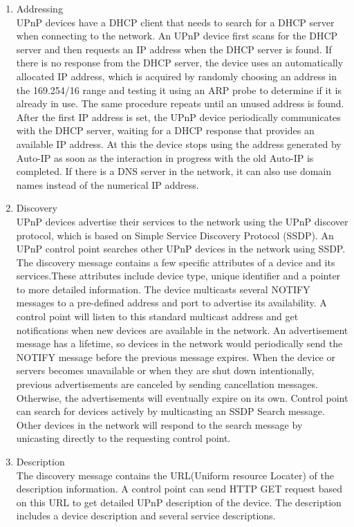 \begin{enumerate} 
\item Addressing \\ 
UPnP devices have a DHCP client that needs to search for a DHCP server when connecting to the network. An UPnP device first scans for the DHCP server and then requests an IP address when the DHCP server is found. If there is no response from the DHCP server, the device uses an automatically allocated IP address, which is acquired by randomly choosing an address in the 169.254/16 range and testing it using an ARP probe to determine if it is already in use. The same procedure repeats until an unused address is found. After the first IP address is set, the UPnP device periodically communicates with the DHCP server, waiting for a DHCP response that provides an available IP address. At this the device stops using the address generated by Auto-IP as soon as the interaction in progress with the old Auto-IP is completed. If there is a DNS server in the network, it can also use domain names instead of the numerical IP address. 
\item Discovery \\ 
UPnP devices advertise their services to the network using the UPnP discover protocol, which is based on 
Simple Service Discovery Protocol (SSDP). An UPnP control point searches other UPnP devices in the network using SSDP. The discovery message contains a few specific attributes 
of a device and its services.These attributes include device type, unique identifier and a 
pointer to more detailed information. 
The device multicasts several NOTIFY messages to a pre-defined address and port to advertise 
its availability. A control point will listen to this standard multicast address and get 
notifications when new devices are available in the network. 
An advertisement message has a lifetime, so devices in the network would periodically send 
the NOTIFY message before the previous message expires. When the device or servers becomes unavailable or when they are shut down intentionally, previous advertisements are canceled by sending cancellation messages. Otherwise, the advertisements will eventually expire on its own. 
Control point can search for devices actively by multicasting an SSDP Search message. Other devices 
in the network will respond to the search message by unicasting directly to the requesting control point. 
\item Description \\ 
The discovery message contains the URL(Uniform resource Locater) of the description information. A control point can send HTTP GET request based on this URL to get detailed UPnP description of the device. The description includes a device description and several service descriptions. 


\end{enumerate}
